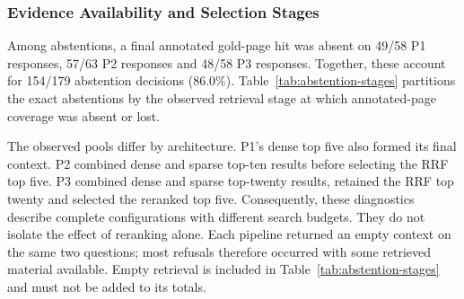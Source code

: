 \subsubsection{Evidence Availability and Selection Stages}
Among abstentions, a final annotated gold-page hit was absent on 49/58 P1
responses, 57/63 P2 responses and 48/58 P3 responses. Together, these account
for 154/179 abstention decisions (86.0\%).
Table~\ref{tab:abstention-stages} partitions the exact abstentions by the
observed retrieval stage at which annotated-page coverage was absent or lost.

\begin{table}[H]
\centering
\caption{Observed annotated-page retrieval conditions among exact
abstentions. These mutually exclusive stage conditions partition the 179
abstaining RAG responses; they are not validated internal reasons for refusal.
Candidate-pool absence includes the two empty retrievals per configuration.}
\label{tab:abstention-stages}
\end{table}

The observed pools differ by architecture. P1's dense top five also formed its
final context. P2 combined dense and sparse top-ten results before selecting
the RRF top five. P3 combined dense and sparse top-twenty results, retained
the RRF top twenty and selected the reranked top five. Consequently, these
diagnostics describe complete configurations with different search budgets.
They do not isolate the effect of reranking alone. Each pipeline returned
an empty context on the same two questions; most refusals therefore occurred
with some retrieved material available. Empty retrieval is included in
Table~\ref{tab:abstention-stages} and must not be added to its totals.

